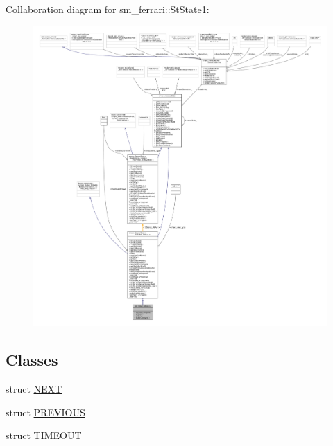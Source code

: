 Collaboration diagram for sm\+\_\+ferrari\+:\+:St\+State1\+:
\nopagebreak
\begin{figure}[H]
\begin{center}
\leavevmode
\includegraphics[width=350pt]{structsm__ferrari_1_1StState1__coll__graph}
\end{center}
\end{figure}
\subsection*{Classes}
\begin{DoxyCompactItemize}
\item 
struct \hyperlink{structsm__ferrari_1_1StState1_1_1NEXT}{N\+E\+XT}
\item 
struct \hyperlink{structsm__ferrari_1_1StState1_1_1PREVIOUS}{P\+R\+E\+V\+I\+O\+US}
\item 
struct \hyperlink{structsm__ferrari_1_1StState1_1_1TIMEOUT}{T\+I\+M\+E\+O\+UT}
\end{DoxyCompactItemize}
